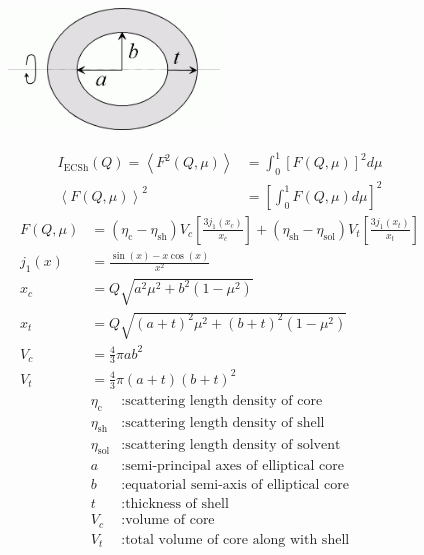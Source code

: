 \begin{figure}[htb]
\begin{center}
\includegraphics[width=0.5\textwidth,height=0.28855\textwidth]{ellipsoidalShell.png}
\end{center}
\caption{} \label{ellipsoidalShell}
\end{figure}
\begin{align}
I_\text{ECSh}(Q) = \left\langle F^2(Q,\mu) \right\rangle
& = \int_0^1 \left[F(Q,\mu)\right]^2 d\mu \\
\left\langle F(Q,\mu) \right\rangle^2 & = \left[\int_0^1 F(Q,\mu)
d\mu \right]^2
\end{align}
\begin{align}
F(Q,\mu) &= \left(\eta_\text{c}-\eta_\text{sh}\right) V_c\left[
\frac{3j_1(x_c)}{x_c}\right]
          +\left(\eta_\text{sh}-\eta_\text{sol}\right) V_t\left[ \frac{3j_1(x_t)}{x_t}\right]
          \nonumber \\
j_1(x) &= \frac{\sin(x)-x\cos(x)}{x^2} \nonumber \\
x_c &= Q \sqrt{a^2\mu^2+b^2(1-\mu^2)} \nonumber \\
x_t &= Q \sqrt{(a+t)^2\mu^2+(b+t)^2(1-\mu^2)} \nonumber \\
V_c &= \frac{4}{3}\pi ab^2 \nonumber \\
V_t &= \frac{4}{3}\pi (a+t)(b+t)^2 \nonumber
\end{align}
\begin{align}
\eta_\text{c} &: \text{scattering length density of core} \nonumber \\
\eta_\text{sh} &: \text{scattering length density of shell} \nonumber \\
\eta_\text{sol} &: \text{scattering length density of solvent} \nonumber \\
a &: \text{semi-principal axes of elliptical core} \nonumber \\
b &: \text{equatorial semi-axis of elliptical core} \nonumber \\
t &: \text{thickness of shell} \nonumber \\
V_c &: \text{volume of core} \nonumber \\
V_t &: \text{total volume of core along with shell} \nonumber
\end{align}

